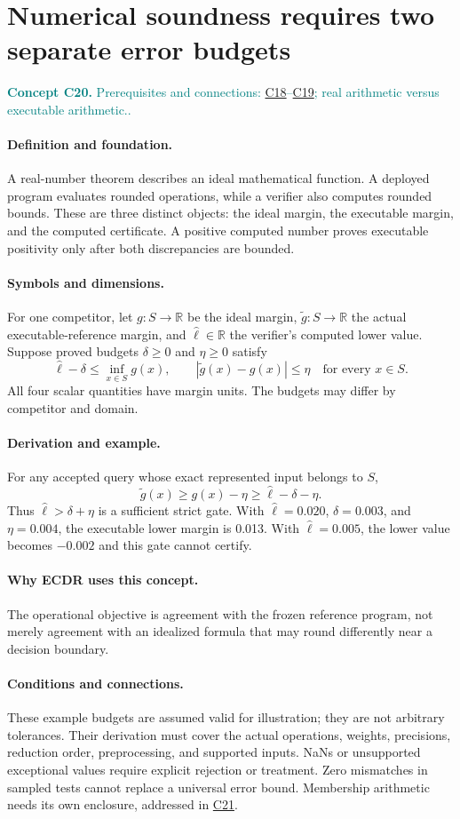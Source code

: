 \documentclass[11pt,a4paper]{article}
\newcommand{\R}{\mathbb R}
\newcommand{\abs}[1]{\left\lvert#1\right\rvert}
\newcommand{\conceptid}{Front matter}
\newcommand{\concept}[3]{\clearpage\renewcommand{\conceptid}{#1}%
\section{#2}\label{concept:#1}%
\textcolor{teal}{\textbf{Concept #1.} Prerequisites and connections: #3.}\par
\typeout{ECDR-CONCEPT-START #1 PAGE=\thepage}}
\begin{document}
\concept{C20}{Numerical soundness requires two separate error budgets}{\hyperref[concept:C18]{C18}--\hyperref[concept:C19]{C19}; real arithmetic versus executable arithmetic.}
\paragraph{Definition and foundation.}
A real-number theorem describes an ideal mathematical function. A deployed program evaluates rounded operations, while a verifier also computes rounded bounds. These are three distinct objects: the ideal margin, the executable margin, and the computed certificate. A positive computed number proves executable positivity only after both discrepancies are bounded.
\paragraph{Symbols and dimensions.}
For one competitor, let $g:S\to\R$ be the ideal margin, $\widetilde g:S\to\R$ the actual executable-reference margin, and $\widehat\ell\in\R$ the verifier's computed lower value. Suppose proved budgets $\delta\ge0$ and $\eta\ge0$ satisfy
\[
 \widehat\ell-\delta\le\inf_{x\in S}g(x),\qquad
 \abs{\widetilde g(x)-g(x)}\le\eta\quad\text{for every }x\in S.
\]
All four scalar quantities have margin units. The budgets may differ by competitor and domain.
\paragraph{Derivation and example.}
For any accepted query whose exact represented input belongs to $S$,
\[
 \widetilde g(x)\ge g(x)-\eta
 \ge\widehat\ell-\delta-\eta.
\]
Thus $\widehat\ell>\delta+\eta$ is a sufficient strict gate. With $\widehat\ell=0.020$, $\delta=0.003$, and $\eta=0.004$, the executable lower margin is 0.013. With $\widehat\ell=0.005$, the lower value becomes $-0.002$ and this gate cannot certify.
\paragraph{Why ECDR uses this concept.}
The operational objective is agreement with the frozen reference program, not merely agreement with an idealized formula that may round differently near a decision boundary.
\paragraph{Conditions and connections.}
These example budgets are assumed valid for illustration; they are not arbitrary tolerances. Their derivation must cover the actual operations, weights, precisions, reduction order, preprocessing, and supported inputs. NaNs or unsupported exceptional values require explicit rejection or treatment. Zero mismatches in sampled tests cannot replace a universal error bound. Membership arithmetic needs its own enclosure, addressed in \hyperref[concept:C21]{C21}.
\par\label{endconcept:C20}
\end{document}
